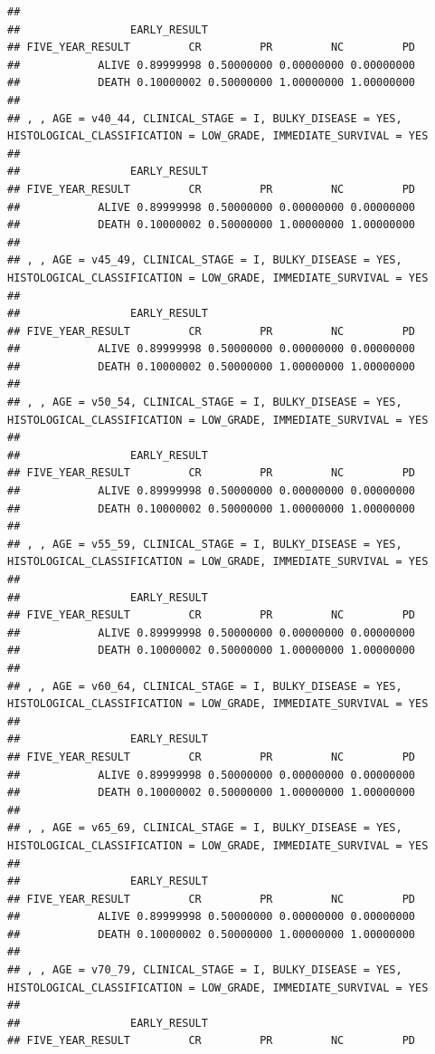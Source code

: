 \documentclass[]{article}
\begin{document}
\begin{verbatim}
## 
##                 EARLY_RESULT
## FIVE_YEAR_RESULT         CR         PR         NC         PD
##            ALIVE 0.89999998 0.50000000 0.00000000 0.00000000
##            DEATH 0.10000002 0.50000000 1.00000000 1.00000000
## 
## , , AGE = v40_44, CLINICAL_STAGE = I, BULKY_DISEASE = YES, HISTOLOGICAL_CLASSIFICATION = LOW_GRADE, IMMEDIATE_SURVIVAL = YES
## 
##                 EARLY_RESULT
## FIVE_YEAR_RESULT         CR         PR         NC         PD
##            ALIVE 0.89999998 0.50000000 0.00000000 0.00000000
##            DEATH 0.10000002 0.50000000 1.00000000 1.00000000
## 
## , , AGE = v45_49, CLINICAL_STAGE = I, BULKY_DISEASE = YES, HISTOLOGICAL_CLASSIFICATION = LOW_GRADE, IMMEDIATE_SURVIVAL = YES
## 
##                 EARLY_RESULT
## FIVE_YEAR_RESULT         CR         PR         NC         PD
##            ALIVE 0.89999998 0.50000000 0.00000000 0.00000000
##            DEATH 0.10000002 0.50000000 1.00000000 1.00000000
## 
## , , AGE = v50_54, CLINICAL_STAGE = I, BULKY_DISEASE = YES, HISTOLOGICAL_CLASSIFICATION = LOW_GRADE, IMMEDIATE_SURVIVAL = YES
## 
##                 EARLY_RESULT
## FIVE_YEAR_RESULT         CR         PR         NC         PD
##            ALIVE 0.89999998 0.50000000 0.00000000 0.00000000
##            DEATH 0.10000002 0.50000000 1.00000000 1.00000000
## 
## , , AGE = v55_59, CLINICAL_STAGE = I, BULKY_DISEASE = YES, HISTOLOGICAL_CLASSIFICATION = LOW_GRADE, IMMEDIATE_SURVIVAL = YES
## 
##                 EARLY_RESULT
## FIVE_YEAR_RESULT         CR         PR         NC         PD
##            ALIVE 0.89999998 0.50000000 0.00000000 0.00000000
##            DEATH 0.10000002 0.50000000 1.00000000 1.00000000
## 
## , , AGE = v60_64, CLINICAL_STAGE = I, BULKY_DISEASE = YES, HISTOLOGICAL_CLASSIFICATION = LOW_GRADE, IMMEDIATE_SURVIVAL = YES
## 
##                 EARLY_RESULT
## FIVE_YEAR_RESULT         CR         PR         NC         PD
##            ALIVE 0.89999998 0.50000000 0.00000000 0.00000000
##            DEATH 0.10000002 0.50000000 1.00000000 1.00000000
## 
## , , AGE = v65_69, CLINICAL_STAGE = I, BULKY_DISEASE = YES, HISTOLOGICAL_CLASSIFICATION = LOW_GRADE, IMMEDIATE_SURVIVAL = YES
## 
##                 EARLY_RESULT
## FIVE_YEAR_RESULT         CR         PR         NC         PD
##            ALIVE 0.89999998 0.50000000 0.00000000 0.00000000
##            DEATH 0.10000002 0.50000000 1.00000000 1.00000000
## 
## , , AGE = v70_79, CLINICAL_STAGE = I, BULKY_DISEASE = YES, HISTOLOGICAL_CLASSIFICATION = LOW_GRADE, IMMEDIATE_SURVIVAL = YES
## 
##                 EARLY_RESULT
## FIVE_YEAR_RESULT         CR         PR         NC         PD

\end{verbatim}
\end{document}
